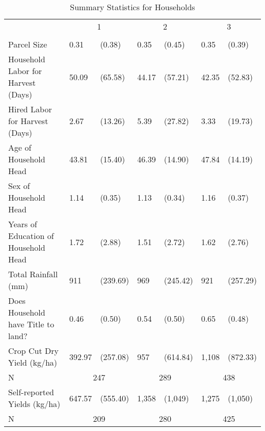\begin{table}
\caption{Summary Statistics for Households}
\label{tbl:summary}
\begin{tabular}{lllllll}
\toprule
 & \multicolumn{2}{c}{1} & \multicolumn{2}{c}{2} & \multicolumn{2}{c}{3} \\
 &  &  &  &  &  &  \\
\midrule
Parcel Size & 0.31 & (0.38) & 0.35 & (0.45) & 0.35 & (0.39) \\
Household Labor for Harvest (Days) & 50.09 & (65.58) & 44.17 & (57.21) & 42.35 & (52.83) \\
Hired Labor for Harvest (Days) & 2.67 & (13.26) & 5.39 & (27.82) & 3.33 & (19.73) \\
Age of Household Head & 43.81 & (15.40) & 46.39 & (14.90) & 47.84 & (14.19) \\
Sex of Household Head & 1.14 & (0.35) & 1.13 & (0.34) & 1.16 & (0.37) \\
Years of Education of Household Head & 1.72 & (2.88) & 1.51 & (2.72) & 1.62 & (2.76) \\
Total Rainfall (mm) & 911 & (239.69) & 969 & (245.42) & 921 & (257.29) \\
Does Household have Title to land? & 0.46 & (0.50) & 0.54 & (0.50) & 0.65 & (0.48) \\
Crop Cut Dry Yield (kg/ha) & 392.97 & (257.08) & 957 & (614.84) & 1,108 & (872.33) \\
\midrule
N & \multicolumn{2}{c}{247}&\multicolumn{2}{c}{289}&\multicolumn{2}{c}{438}\\
\midrule
Self-reported Yields (kg/ha) & 647.57 & (555.40) & 1,358 & (1,049) & 1,275 & (1,050) \\
\midrule
N & \multicolumn{2}{c}{209}&\multicolumn{2}{c}{280}&\multicolumn{2}{c}{425}\\
\bottomrule
\end{tabular}
\end{table}
